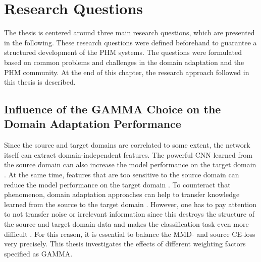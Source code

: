 \chapter{Research Questions}\label{chapter:research_approach}
The thesis is centered around three main research questions, which are presented in the following. These research questions were defined beforehand to guarantee a structured development of the PHM systems. The questions were formulated based on common problems and challenges in the domain adaptation and the PHM community. At the end of this chapter, the research approach followed in this thesis is described.

\section{Influence of the GAMMA Choice on the Domain Adaptation Performance}
Since the source and target domains are correlated to some extent, the network itself can extract domain-independent features. The powerful CNN learned from the source domain can also increase the model performance on the target domain \cite{li2020}. At the same time, features that are too sensitive to the source domain can reduce the model performance on the target domain \cite{li2020}. To counteract that phenomenon, domain adaptation approaches can help to transfer knowledge learned from the source to the target domain \cite{li2020}. However, one has to pay attention to not transfer noise or irrelevant information since this destroys the structure of the source and target domain data and makes the classification task even more difficult \cite{li2020}. For this reason, it is essential to balance the MMD- and source CE-loss very precisely. This thesis investigates the effects of different weighting factors specified as GAMMA.

